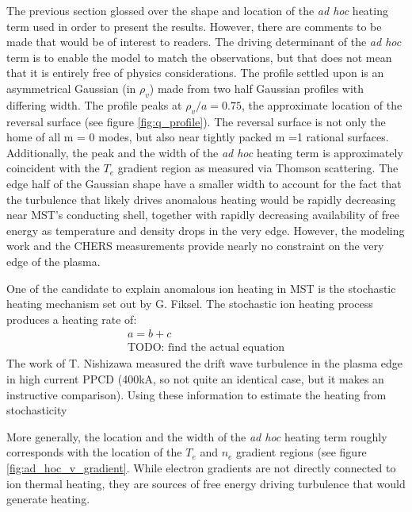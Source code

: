 The previous section glossed over the shape and location of the \textit{ad hoc} heating term used in order to present the results. However, there are comments to be made that would be of interest to readers. The driving determinant of the \textit{ad hoc} term is to enable the model to match the observations, but that does not mean that it is entirely free of physics considerations. The profile settled upon is an asymmetrical Gaussian (in $\rho_v$) made from two half Gaussian profiles with differing width. The profile peaks at $\rho_v/a = 0.75$, the approximate location of the reversal surface (see figure \ref{fig:q_profile}). The reversal surface is not only the home of all m = 0 modes, but also near tightly packed m =1 rational surfaces. Additionally, the peak and the width of the \textit{ad hoc} heating term is approximately coincident with the $T_e$ gradient region as measured via Thomson scattering. The edge half of the Gaussian shape have a smaller width to account for the fact that the turbulence that likely drives anomalous heating would be rapidly decreasing near MST's conducting shell, together with rapidly decreasing availability of free energy as temperature and density drops in the very edge. However, the modeling work and the CHERS measurements provide nearly no constraint on the very edge of the plasma. 

One of the candidate to explain anomalous ion heating in MST is the stochastic heating mechanism set out by G. Fiksel\cite{Fiksel2009}. The stochastic ion heating process produces a heating rate of:
\begin{align}
    a =b+c\\
    \text{TODO: find the actual equation}
\end{align}
The work of T. Nishizawa\cite{Nishizawa2018} measured the drift wave turbulence in the plasma edge in high current PPCD (400kA, so not quite an identical case, but it makes an instructive comparison). Using these information to estimate the heating from stochasticity

More generally, the location and the width of the \textit{ad hoc} heating term roughly corresponds with the location of the $T_e$ and $n_e$ gradient regions (see figure \ref{fig:ad_hoc_v_gradient}. While electron gradients are not directly connected to ion thermal heating, they are sources of free energy driving turbulence that would generate heating. 

